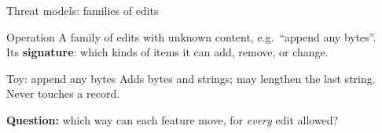 \documentclass[aspectratio=169,11pt]{beamer}
\newcommand{\good}[1]{\textcolor{green!45!black}{#1}}
\newcommand{\bad}[1]{\textcolor{red!70!black}{#1}}
\begin{document}

\newcommand{\up}{\good{$\uparrow$ up}}
\newcommand{\down}{\bad{$\downarrow$ down}}
\newcommand{\fixed}{\textcolor{gray}{$=$ fixed}}
\newcommand{\both}{\textcolor{orange!80!black}{$\updownarrow$ both}}

\begin{frame}{Threat models: families of edits}
  \begin{block}{Operation}
    A family of edits with unknown content, e.g.\ ``append any bytes''.\\
    Its \textbf{signature}: which kinds of items it can add, remove, or change.
  \end{block}
  \vfill
  \begin{exampleblock}{Toy: append any bytes}
    Adds bytes and strings; may lengthen the last string. Never touches a record.
  \end{exampleblock}
  \vfill
  \begin{center}
    \textbf{Question:} which way can each feature move, for \emph{every} edit allowed?
  \end{center}
\end{frame}
\end{document}
